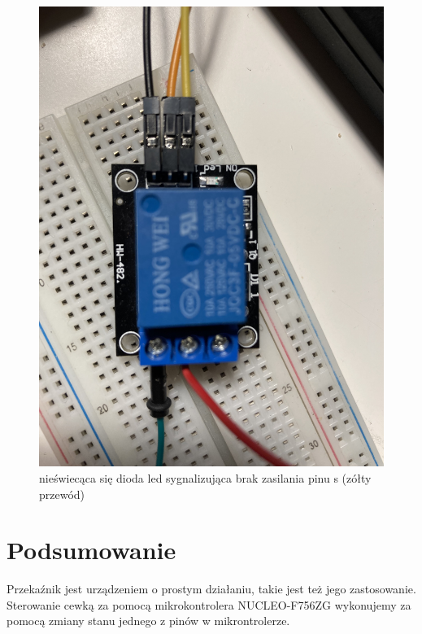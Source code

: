 \documentclass[11pt, a4paper]{article}
\begin{document}
\vspace{0.5cm}
\begin{figure}[h!]
    \centering
    \includegraphics[scale=0.08]{fig/obrazki/działanie_ukladu/bliskof.jpg}
    \caption{nieświecąca się dioda led sygnalizująca brak zasilania pinu s (zółty przewód)}
    \label{fig:my_label}
\end{figure}
\vspace{0.5cm}




\section*{Podsumowanie} 
Przekaźnik jest urządzeniem o prostym działaniu, takie jest też jego zastosowanie. Sterowanie cewką za pomocą mikrokontrolera NUCLEO-F756ZG wykonujemy za pomocą zmiany stanu jednego z pinów w mikrontrolerze.

\printbibliography[heading=bibintoc]
\end{document}
